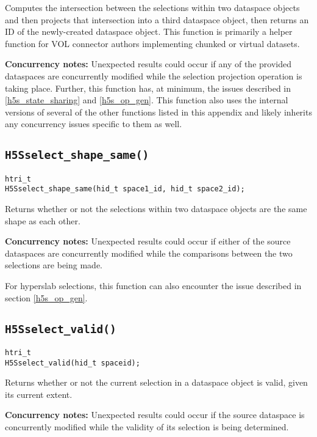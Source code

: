 \documentclass[../HDF5_RFC.tex]{subfiles}
\begin{document}
Computes the intersection between the selections within two dataspace objects and then projects
that intersection into a third dataspace object, then returns an ID of the newly-created dataspace
object. This function is primarily a helper function for VOL connector authors implementing chunked
or virtual datasets.

\textbf{Concurrency notes:} Unexpected results could occur if any of the provided dataspaces are
concurrently modified while the selection projection operation is taking place. Further, this function
has, at minimum, the issues described in \ref{h5s_state_sharing} and \ref{h5s_op_gen}. This function
also uses the internal versions of several of the other functions listed in this appendix and likely
inherits any concurrency issues specific to them as well.

\subsection{\texttt{H5Sselect\_shape\_same()}}
\label{apdx:h5s_func_h5sselect_shape_same}

\begin{verbatim}
htri_t
H5Sselect_shape_same(hid_t space1_id, hid_t space2_id);
\end{verbatim}

Returns whether or not the selections within two dataspace objects are the same shape as each other.

\textbf{Concurrency notes:} Unexpected results could occur if either of the source dataspaces are
concurrently modified while the comparisons between the two selections are being made.

For hyperslab selections, this function can also encounter the issue described in section
\ref{h5s_op_gen}.

\subsection{\texttt{H5Sselect\_valid()}}
\label{apdx:h5s_func_h5sselect_valid}

\begin{verbatim}
htri_t
H5Sselect_valid(hid_t spaceid);
\end{verbatim}

Returns whether or not the current selection in a dataspace object is valid, given its current extent.

\textbf{Concurrency notes:} Unexpected results could occur if the source dataspace is concurrently
modified while the validity of its selection is being determined.
\end{document}
